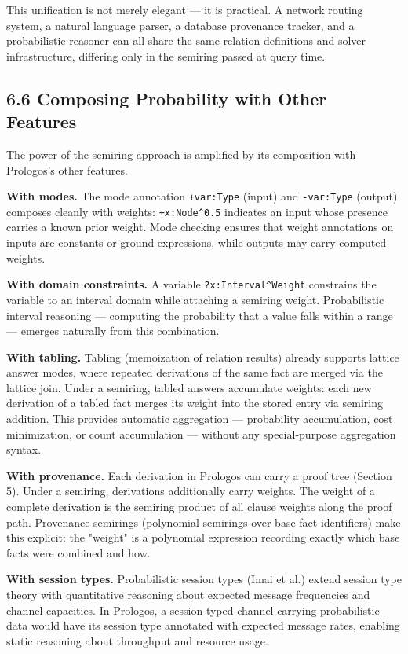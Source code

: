 \documentclass[11pt]{article}
\begin{document}
This unification is not merely elegant --- it is practical. A network routing system, a natural language parser, a database provenance tracker, and a probabilistic reasoner can all share the same relation definitions and solver infrastructure, differing only in the semiring passed at query time.
\subsection{6.6 Composing Probability with Other Features}
\label{sec:orgd254ea3}

The power of the semiring approach is amplified by its composition with Prologos's other features.

\textbf{With modes.} The mode annotation \texttt{+var:Type} (input) and \texttt{-var:Type} (output) composes cleanly with weights: \texttt{+x:Node\textasciicircum{}0.5} indicates an input whose presence carries a known prior weight. Mode checking ensures that weight annotations on inputs are constants or ground expressions, while outputs may carry computed weights.

\textbf{With domain constraints.} A variable \texttt{?x:Interval\textasciicircum{}Weight} constrains the variable to an interval domain while attaching a semiring weight. Probabilistic interval reasoning --- computing the probability that a value falls within a range --- emerges naturally from this combination.

\textbf{With tabling.} Tabling (memoization of relation results) already supports lattice answer modes, where repeated derivations of the same fact are merged via the lattice join. Under a semiring, tabled answers accumulate weights: each new derivation of a tabled fact merges its weight into the stored entry via semiring addition. This provides automatic aggregation --- probability accumulation, cost minimization, or count accumulation --- without any special-purpose aggregation syntax.

\textbf{With provenance.} Each derivation in Prologos can carry a proof tree (Section 5). Under a semiring, derivations additionally carry weights. The weight of a complete derivation is the semiring product of all clause weights along the proof path. Provenance semirings (polynomial semirings over base fact identifiers) make this explicit: the "weight" is a polynomial expression recording exactly which base facts were combined and how.

\textbf{With session types.} Probabilistic session types (Imai et al.) extend session type theory with quantitative reasoning about expected message frequencies and channel capacities. In Prologos, a session-typed channel carrying probabilistic data would have its session type annotated with expected message rates, enabling static reasoning about throughput and resource usage.
\end{document}
